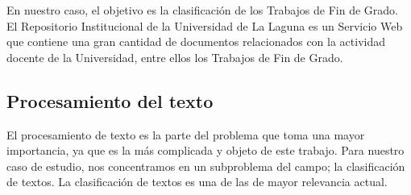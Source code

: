 En nuestro caso, el objetivo es la clasificación de los Trabajos de Fin de Grado. El Repositorio Institucional de la Universidad de La Laguna \cite{riull} es un Servicio Web que contiene una gran cantidad de documentos relacionados con la actividad docente de la Universidad, entre ellos los Trabajos de Fin de Grado.

\subsection{Procesamiento del texto}

El procesamiento de texto es la parte del problema que toma una mayor importancia, ya que es la más complicada y objeto de este trabajo.
%
Para nuestro caso de estudio, nos concentramos en un subproblema del campo; la clasificación de textos. La clasificación de textos es una de las de mayor relevancia actual.